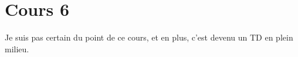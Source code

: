 \section{Cours 6}
Je suis pas certain du point de ce cours, et en plus, c'est devenu un TD en plein milieu.
